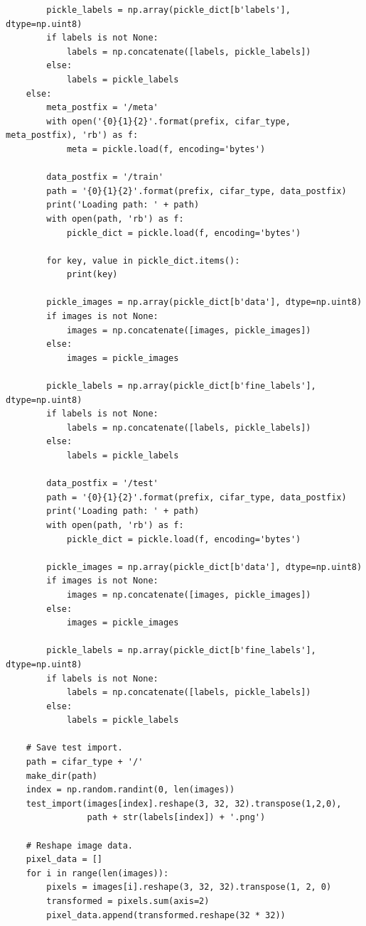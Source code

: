 \documentclass[letterpaper]{article} %
\begin{document}
{\begin{verbatim}
        pickle_labels = np.array(pickle_dict[b'labels'], dtype=np.uint8)
        if labels is not None:
            labels = np.concatenate([labels, pickle_labels])
        else:
            labels = pickle_labels
    else:
        meta_postfix = '/meta'
        with open('{0}{1}{2}'.format(prefix, cifar_type, meta_postfix), 'rb') as f:
            meta = pickle.load(f, encoding='bytes')

        data_postfix = '/train'
        path = '{0}{1}{2}'.format(prefix, cifar_type, data_postfix)
        print('Loading path: ' + path)
        with open(path, 'rb') as f:
            pickle_dict = pickle.load(f, encoding='bytes')

        for key, value in pickle_dict.items():
            print(key)

        pickle_images = np.array(pickle_dict[b'data'], dtype=np.uint8)
        if images is not None:
            images = np.concatenate([images, pickle_images])
        else:
            images = pickle_images

        pickle_labels = np.array(pickle_dict[b'fine_labels'], dtype=np.uint8)
        if labels is not None:
            labels = np.concatenate([labels, pickle_labels])
        else:
            labels = pickle_labels

        data_postfix = '/test'
        path = '{0}{1}{2}'.format(prefix, cifar_type, data_postfix)
        print('Loading path: ' + path)
        with open(path, 'rb') as f:
            pickle_dict = pickle.load(f, encoding='bytes')

        pickle_images = np.array(pickle_dict[b'data'], dtype=np.uint8)
        if images is not None:
            images = np.concatenate([images, pickle_images])
        else:
            images = pickle_images

        pickle_labels = np.array(pickle_dict[b'fine_labels'], dtype=np.uint8)
        if labels is not None:
            labels = np.concatenate([labels, pickle_labels])
        else:
            labels = pickle_labels

    # Save test import.
    path = cifar_type + '/'
    make_dir(path)
    index = np.random.randint(0, len(images))
    test_import(images[index].reshape(3, 32, 32).transpose(1,2,0),
                path + str(labels[index]) + '.png')

    # Reshape image data.
    pixel_data = []
    for i in range(len(images)):
        pixels = images[i].reshape(3, 32, 32).transpose(1, 2, 0)
        transformed = pixels.sum(axis=2)
        pixel_data.append(transformed.reshape(32 * 32))


\end{verbatim}}
\end{document}

